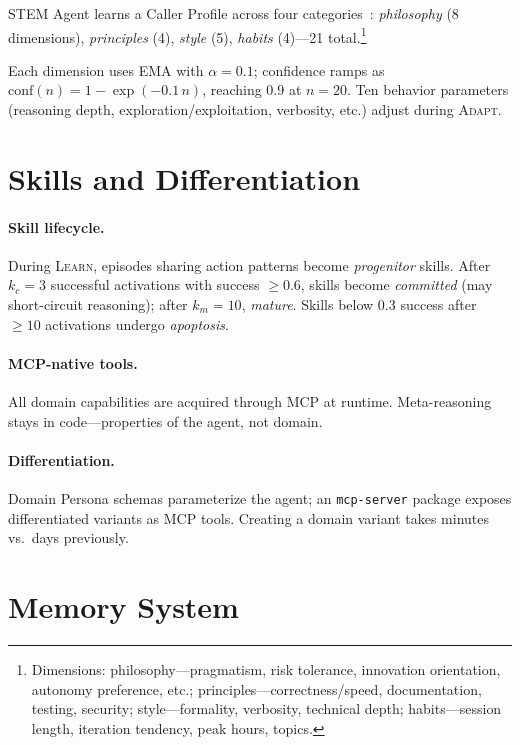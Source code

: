 \documentclass[11pt]{article}
\begin{document}
STEM Agent learns a Caller Profile across four categories~\citep{park2023generative}: \emph{philosophy} (8 dimensions), \emph{principles} (4), \emph{style} (5), \emph{habits} (4)---21 total.\footnote{Dimensions: philosophy---pragmatism, risk tolerance, innovation orientation, autonomy preference, etc.; principles---correctness/speed, documentation, testing, security; style---formality, verbosity, technical depth; habits---session length, iteration tendency, peak hours, topics.}

Each dimension uses EMA with $\alpha=0.1$; confidence ramps as $\text{conf}(n) = 1 - \exp(-0.1\,n)$, reaching 0.9 at $n=20$. Ten behavior parameters (reasoning depth, exploration/exploitation, verbosity, etc.) adjust during \textsc{Adapt}.

\section{Skills and Differentiation}
\label{sec:skills}

\paragraph{Skill lifecycle.}
During \textsc{Learn}, episodes sharing action patterns become \emph{progenitor} skills. After $k_c=3$ successful activations with success $\geq 0.6$, skills become \emph{committed} (may short-circuit reasoning); after $k_m=10$, \emph{mature}. Skills below 0.3 success after $\geq 10$ activations undergo \emph{apoptosis}.

\paragraph{MCP-native tools.}
All domain capabilities are acquired through MCP at runtime. Meta-reasoning stays in code---properties of the agent, not domain.

\paragraph{Differentiation.}
Domain Persona schemas parameterize the agent; an \texttt{mcp-server} package exposes differentiated variants as MCP tools. Creating a domain variant takes minutes vs.\ days previously.

\section{Memory System}
\label{sec:memory}
\end{document}
